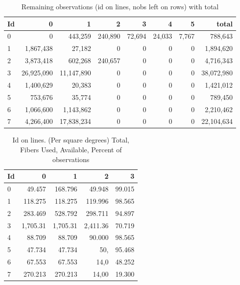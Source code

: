 \documentclass[10pt]{extarticle}
\begin{document}
\begin{multicols}{2}
\begin{table}[H]\begin{center}
\caption{Remaining observations (id on lines, nobs left on rows) with total}\label{tab:full14k}
\begin{tabular}{l|rrrrrrr}
	Id &      0  &           1  &           2  &           3  &           4  &           5  & total\\ \hline
   0  &           0  &     443,259  &     240,890  &      72,694  &      24,033  &       7,767  &     788,643\\
   1  &   1,867,438  &      27,182  &           0  &           0  &           0  &           0  &   1,894,620\\
   2  &   3,873,418  &     602,268  &     240,657  &           0  &           0  &           0  &   4,716,343\\
   3  &  26,925,090  &  11,147,890  &           0  &           0  &           0  &           0  &  38,072,980\\
   4  &   1,400,629  &      20,383  &           0  &           0  &           0  &           0  &   1,421,012\\
   5  &     753,676  &      35,774  &           0  &           0  &           0  &           0  &     789,450\\
   6  &   1,066,600  &   1,143,862  &           0  &           0  &           0  &           0  &   2,210,462\\
   7  &   4,266,400  &  17,838,234  &           0  &           0  &           0  &           0  &  22,104,634\\
\end{tabular}\end{center}
 \end{table}

\begin{table}[H]\begin{center}
\caption{Id on lines. (Per square degrees) Total, Fibers Used, Available, Percent of observations}
\begin{tabular}{l|rrrr} 
   Id &          0  &           1  &           2  &           3 \\ \hline
   0  &      49.457  &     168.796  &      49.948  &      99.015   \\
   1  &     118.275  &     118.275  &     119.996  &      98.565   \\
   2  &     283.469  &     528.792  &     298.711  &      94.897   \\
   3  &    1,705.31  &    1,705.31  &    2,411.36  &      70.719   \\
   4  &      88.709  &      88.709  &      90.000  &      98.565   \\
   5  &      47.734  &      47.734  &         50,  &      95.468   \\
   6  &      67.553  &      67.553  &        14,0  &      48.252   \\
   7  &     270.213  &     270.213  &       14,00  &      19.300   \\
\end{tabular}\end{center}
 \end{table}



\end{multicols}
\end{document}
